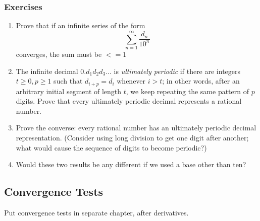 \subsubsection{Exercises}
\begin{enumerate}
\item Prove that if an infinite series of the form
\begin{equation}
\sum_{n=1}^{\infty} \frac{d_n}{10^n}
\end{equation}
converges, the sum must be $<=1$
\item The infinite decimal $0.d_1d_2d_3...$ is  \emph{ultimately periodic} if there are integers $t\geq 0,p\geq 1$ such that $d_{i+p}=d_{i}$ whenever $i>t$; in other words, after an  arbitrary initial segment of length $t$, we keep repeating the same pattern of $p$ digits. Prove that every ultimately periodic decimal represents a rational number.
\item Prove the converse: every rational number has an ultimately periodic decimal representation. (Consider using long division to get one digit after another; what would cause the sequence of digits to become periodic?)
\item Would these two results be any different if we used a base other than ten?
\end{enumerate}


{\color{red}
 \subsection{Convergence Tests}
 Put convergence tests in separate chapter, after derivatives.}
%
%
